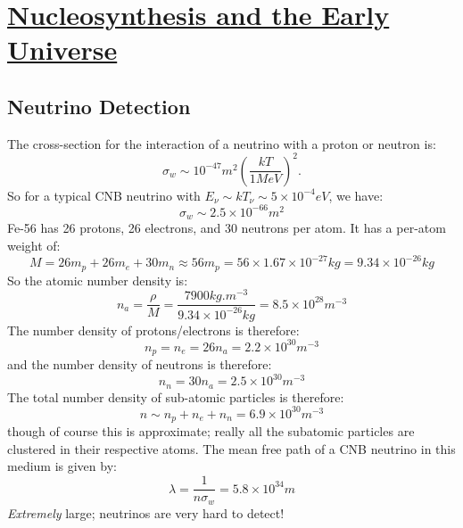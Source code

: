 \section[Nucleosynthesis and the Early Universe]{\hyperlink{toc}{Nucleosynthesis and the Early Universe}}

\subsection{}
\subsection{}
\subsection{}
\subsection{}
\subsection{Neutrino Detection}
The cross-section for the interaction of a neutrino with a proton or neutron is:
\begin{equation}
    \sigma_w \sim 10^{-47}\si{m^2}\left(\frac{kT}{1\si{MeV}}\right)^2.
\end{equation}
So for a typical CNB neutrino with $E_\nu \sim kT_\nu \sim 5 \times 10^{-4}\si{eV}$, we have:
\begin{equation}
    \boxed{\sigma_w \sim 2.5 \times 10^{-66}\si{m^2}}
\end{equation}
Fe-56 has 26 protons, 26 electrons, and 30 neutrons per atom. It has a per-atom weight of:
\begin{equation}
    M = 26m_p + 26m_e + 30m_n \approx 56m_p = 56 \times 1.67 \times 10^{-27}\si{kg} =  9.34 \times 10^{-26}\si{kg}
\end{equation}
So the atomic number density is:
\begin{equation}
    n_a = \frac{\rho}{M} = \frac{7900\si{kg.m^{-3}}}{9.34 \times 10^{-26}\si{kg}} = 8.5 \times 10^{28}\si{m^{-3}}
\end{equation}
The number density of protons/electrons is therefore:
\begin{equation}
    \boxed{n_p = n_e = 26n_a = 2.2 \times 10^{30}\si{m^{-3}}}
\end{equation}
and the number density of neutrons is therefore:
\begin{equation}
    \boxed{n_n = 30n_a = 2.5 \times 10^{30}\si{m^{-3}}}
\end{equation}
The total number density of sub-atomic particles is therefore:
\begin{equation}
    n \sim n_p + n_e + n_n = 6.9 \times 10^{30}\si{m^{-3}}
\end{equation}
though of course this is approximate; really all the subatomic particles are clustered in their respective atoms. The mean free path of a CNB neutrino in this medium is given by:
\begin{equation}
    \boxed{\lambda = \frac{1}{n\sigma_w} = 5.8 \times 10^{34}\si{m}}
\end{equation}
\emph{Extremely} large; neutrinos are very hard to detect!